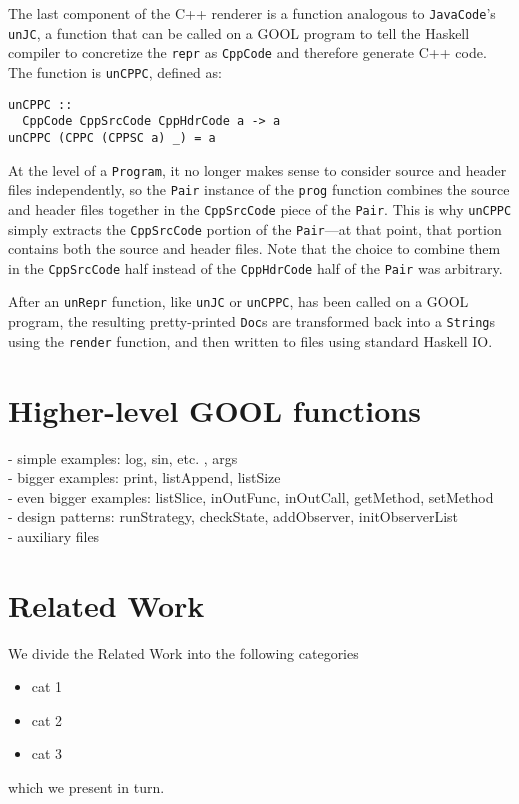 \documentclass[sigplan,review,anonymous]{acmart}
\begin{document}
The last component of the C++ renderer is a function analogous to 
\verb|JavaCode|'s \verb|unJC|, a function that can be called on a GOOL program 
to tell the Haskell compiler to concretize the \verb|repr| as \verb|CppCode| 
and therefore generate C++ code. The function is \verb|unCPPC|, defined as:
\begin{lstlisting}
unCPPC :: 
  CppCode CppSrcCode CppHdrCode a -> a
unCPPC (CPPC (CPPSC a) _) = a
\end{lstlisting}
At the level of a \verb|Program|, it no longer makes sense to consider source 
and header files independently, so the \verb|Pair| instance of the \verb|prog| 
function combines the source and header files together in the \verb|CppSrcCode| 
piece of the \verb|Pair|. This is why \verb|unCPPC| simply extracts the 
\verb|CppSrcCode| portion of the \verb|Pair|---at that point, that portion 
contains both the source and header files. Note that the choice to combine them 
in the \verb|CppSrcCode| half instead of the \verb|CppHdrCode| half of the 
\verb|Pair| was arbitrary.

After an \verb|unRepr| function, like \verb|unJC| or \verb|unCPPC|, has been 
called on a GOOL program, the resulting pretty-printed \verb|Doc|s are 
transformed back into a \verb|String|s using the \verb|render| function, and 
then written to files using standard Haskell IO.

\section{Higher-level GOOL functions} \label{patterns}
- simple examples: log, sin, etc.  , args \\
- bigger examples: print, listAppend, listSize \\
- even bigger examples: listSlice, inOutFunc, inOutCall, getMethod, setMethod \\
- design patterns: runStrategy, checkState, addObserver, initObserverList \\
- auxiliary files
\section{Related Work} \label{related}

We divide the Related Work into the following categories
\begin{itemize}
\item cat 1
\item cat 2
\item cat 3
\end{itemize}
which we present in turn.
\end{document}
